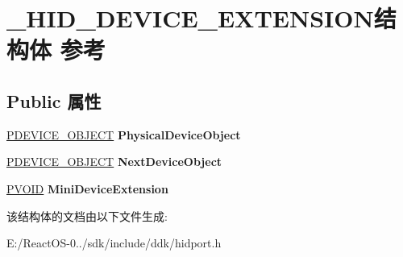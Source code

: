 \hypertarget{struct___h_i_d___d_e_v_i_c_e___e_x_t_e_n_s_i_o_n}{}\section{\+\_\+\+H\+I\+D\+\_\+\+D\+E\+V\+I\+C\+E\+\_\+\+E\+X\+T\+E\+N\+S\+I\+O\+N结构体 参考}
\label{struct___h_i_d___d_e_v_i_c_e___e_x_t_e_n_s_i_o_n}
\subsection*{Public 属性}
\begin{DoxyCompactItemize}
\item 
\mbox{\label{struct___h_i_d___d_e_v_i_c_e___e_x_t_e_n_s_i_o_n_a0250488bcf174929341461518ae61076}} 
\hyperlink{struct___d_e_v_i_c_e___o_b_j_e_c_t}{P\+D\+E\+V\+I\+C\+E\+\_\+\+O\+B\+J\+E\+CT} {\bfseries Physical\+Device\+Object}
\item 
\mbox{\label{struct___h_i_d___d_e_v_i_c_e___e_x_t_e_n_s_i_o_n_acf90054cb03c6da2cf7cd88810003e15}} 
\hyperlink{struct___d_e_v_i_c_e___o_b_j_e_c_t}{P\+D\+E\+V\+I\+C\+E\+\_\+\+O\+B\+J\+E\+CT} {\bfseries Next\+Device\+Object}
\item 
\mbox{\label{struct___h_i_d___d_e_v_i_c_e___e_x_t_e_n_s_i_o_n_a9f4816076fc1c678dc215f4eff03cfcd}} 
\hyperlink{interfacevoid}{P\+V\+O\+ID} {\bfseries Mini\+Device\+Extension}
\end{DoxyCompactItemize}


该结构体的文档由以下文件生成\+:\begin{DoxyCompactItemize}
\item 
E\+:/\+React\+O\+S-\/0../sdk/include/ddk/hidport.\+h\end{DoxyCompactItemize}

